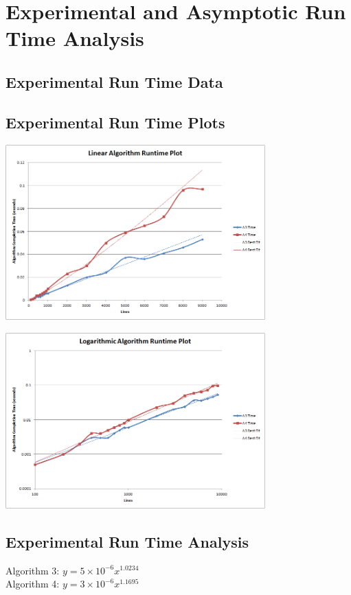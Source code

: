 \documentclass{article}
\begin{document}
\section*{Experimental and Asymptotic Run Time Analysis}
\subsection*{Experimental Run Time Data}


\pagebreak

\subsection*{Experimental Run Time Plots}
\centerline{\includegraphics[width=0.75\textwidth]{plot1.png}}
\centerline{\includegraphics[width=0.75\textwidth]{plot2.png}}

\pagebreak

\subsection*{Experimental Run Time Analysis}
Algorithm 3: $y=5 \times 10^{-6}x^{1.0234}$\\
Algorithm 4: $y=3 \times 10^{-6}x^{1.1695}$\\
\end{document}
